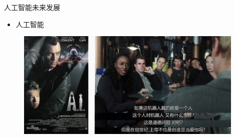 \documentclass{beamer}
\begin{document}
   \begin{frame}{人工智能未来发展}
    \begin{itemize}
     \item 人工智能
    \end{itemize}
   \begin{figure}[H]
   \centering
   \includegraphics[width=4.3in]{cdjPic4.jpg}
   \end{figure}
  \end{frame}
\end{document}
